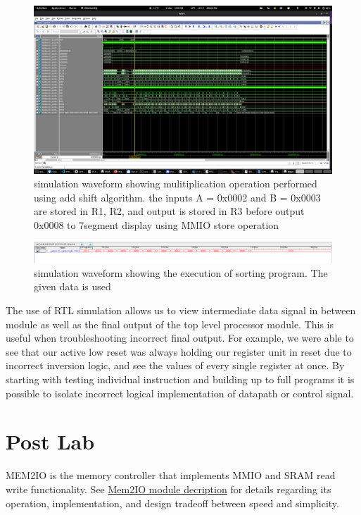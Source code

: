 \documentclass[a4paper,12pt]{report}
\begin{document}
\begin{figure}[H]
    \begin{center}
        \includegraphics[scale=.3]{mul_asm}
        \caption{simulation waveform showing mulitiplication operation performed using add shift algorithm. the inputs A = 0x0002 and B = 0x0003 are stored in R1, R2, and output is stored in R3 before output 0x0008 to 7segment display using MMIO store operation}   
    \end{center}
\end{figure}
\begin{figure}[H]
    \begin{center}
        \includegraphics[scale=.3]{sort_computation1}
        \caption{simulation waveform showing the execution of sorting program. The given data is used }   
    \end{center}
\end{figure}
The use of RTL simulation allows us to view intermediate data signal in between module as well as the final output of the top level processor module. This is useful when troubleshooting incorrect final output. For example, we were able to see that our active low reset was always holding our register unit in reset due to incorrect inversion logic, and see the values of every single register at once. By starting with testing individual instruction and building up to full programs it is possible to isolate incorrect logical implementation of datapath or control signal. 
\pagebreak
\section{Post Lab}
MEM2IO is the memory controller that implements MMIO and SRAM read write functionality. See \hyperref[sec: memcontroller]{Mem2IO module decription} for details regarding its operation, implementation, and design tradeoff between speed and simplicity. 
\newline
\end{document}
